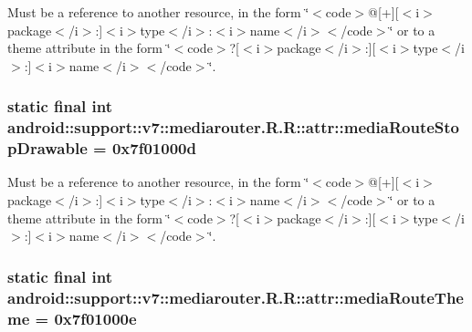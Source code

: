 Must be a reference to another resource, in the form \char`\"{}$<$code$>$@\mbox{[}+\mbox{]}\mbox{[}$<$i$>$package$<$/i$>$:\mbox{]}$<$i$>$type$<$/i$>$:$<$i$>$name$<$/i$>$$<$/code$>$\char`\"{} or to a theme attribute in the form \char`\"{}$<$code$>$?\mbox{[}$<$i$>$package$<$/i$>$:\mbox{]}\mbox{[}$<$i$>$type$<$/i$>$:\mbox{]}$<$i$>$name$<$/i$>$$<$/code$>$\char`\"{}. \hypertarget{classandroid_1_1support_1_1v7_1_1mediarouter_1_1_r_1_1attr_bcf441bb74b1e8f16d6af80434972a8b}{
\subsubsection[{mediaRouteStopDrawable}]{\setlength{\rightskip}{0pt plus 5cm}static final int android::support::v7::mediarouter.R.R::attr::mediaRouteStopDrawable = 0x7f01000d}}
\label{classandroid_1_1support_1_1v7_1_1mediarouter_1_1_r_1_1attr_bcf441bb74b1e8f16d6af80434972a8b}


Must be a reference to another resource, in the form \char`\"{}$<$code$>$@\mbox{[}+\mbox{]}\mbox{[}$<$i$>$package$<$/i$>$:\mbox{]}$<$i$>$type$<$/i$>$:$<$i$>$name$<$/i$>$$<$/code$>$\char`\"{} or to a theme attribute in the form \char`\"{}$<$code$>$?\mbox{[}$<$i$>$package$<$/i$>$:\mbox{]}\mbox{[}$<$i$>$type$<$/i$>$:\mbox{]}$<$i$>$name$<$/i$>$$<$/code$>$\char`\"{}. \hypertarget{classandroid_1_1support_1_1v7_1_1mediarouter_1_1_r_1_1attr_556072d70df6f3856c088c2cd28bbc9d}{
\subsubsection[{mediaRouteTheme}]{\setlength{\rightskip}{0pt plus 5cm}static final int android::support::v7::mediarouter.R.R::attr::mediaRouteTheme = 0x7f01000e}}
\label{classandroid_1_1support_1_1v7_1_1mediarouter_1_1_r_1_1attr_556072d70df6f3856c088c2cd28bbc9d}


